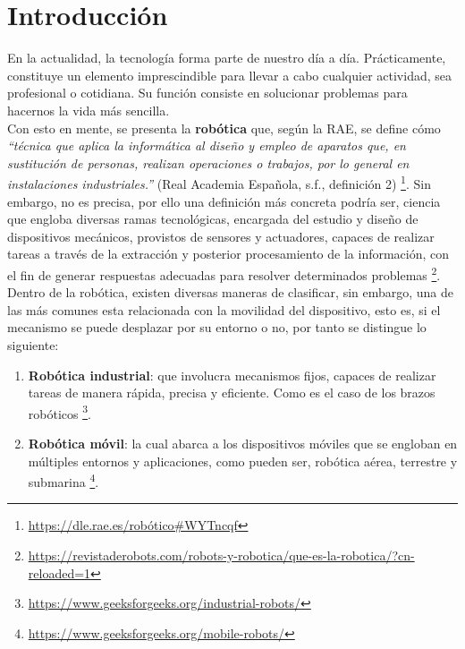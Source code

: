 \chapter{Introducción}
\label{cap:capitulo1}
\setcounter{page}{1}

En la actualidad, la tecnología forma parte de nuestro día a día. Prácticamente, constituye un elemento imprescindible para llevar a cabo cualquier actividad, sea profesional o cotidiana. Su función consiste en solucionar problemas para hacernos la vida más sencilla.\\

Con esto en mente, se presenta la \textbf{robótica} que, según la \ac{RAE}, se define cómo \emph{``técnica que aplica la informática al diseño y empleo de aparatos que, en sustitución de personas, realizan operaciones o trabajos, por lo general en instalaciones industriales.''} (Real Academia Española, s.f., definición 2) \footnote[1]{\href{https://dle.rae.es/rob\%C3\%B3tico\#WYTncqf}{https://dle.rae.es/robótico\#WYTncqf}}. Sin embargo, no es precisa, por ello una definición más concreta podría ser, ciencia que engloba diversas ramas tecnológicas, encargada del estudio y diseño de dispositivos mecánicos, provistos de sensores y actuadores, capaces de realizar tareas a través de la extracción y posterior procesamiento de la información, con el fin de generar respuestas adecuadas para resolver determinados problemas \footnote[2]{\url{https://revistaderobots.com/robots-y-robotica/que-es-la-robotica/?cn-reloaded=1}}.\\

Dentro de la robótica, existen diversas maneras de clasificar, sin embargo, una de las más comunes esta relacionada con la movilidad del dispositivo, esto es, si el mecanismo se puede desplazar por su entorno o no, por tanto se distingue lo siguiente:

\begin{enumerate}
	\item \textbf{Robótica industrial}: que involucra mecanismos fijos, capaces de realizar tareas de manera rápida, precisa y eficiente. Como es el caso de los brazos robóticos \footnote[3]{\url{https://www.geeksforgeeks.org/industrial-robots/}}.

	\item \textbf{Robótica móvil}: la cual abarca a los dispositivos móviles que se engloban en múltiples entornos y aplicaciones, como pueden ser, robótica aérea, terrestre y submarina \footnote[4]{\url{https://www.geeksforgeeks.org/mobile-robots/}}.
\end{enumerate}

